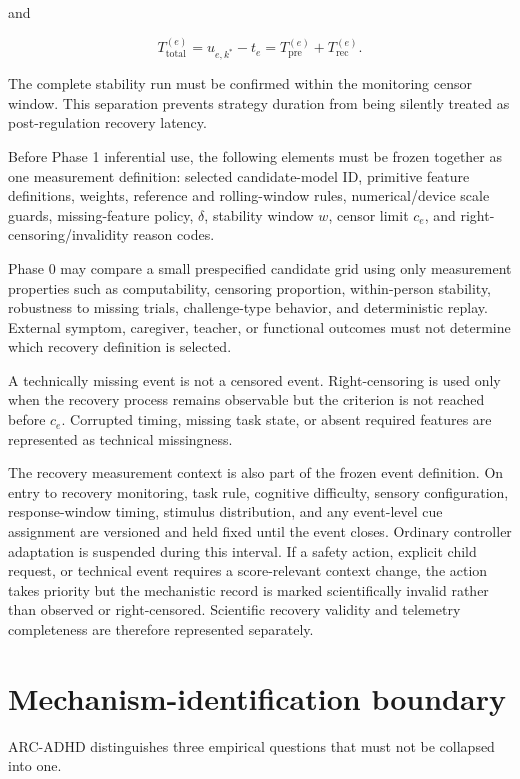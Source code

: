 \documentclass[man]{apa7}
\begin{document}
and

\[
T_{\mathrm{total}}^{(e)}
=
u_{e,k^\ast}-t_e
=
T_{\mathrm{pre}}^{(e)}+T_{\mathrm{rec}}^{(e)}.
\]

The complete stability run must be confirmed within the monitoring censor window. This separation prevents strategy duration from being silently treated as post-regulation recovery latency.

Before Phase 1 inferential use, the following elements must be frozen together as one measurement definition: selected candidate-model ID, primitive feature definitions, weights, reference and rolling-window rules, numerical/device scale guards, missing-feature policy, \(\delta\), stability window \(w\), censor limit \(c_e\), and right-censoring/invalidity reason codes.

Phase 0 may compare a small prespecified candidate grid using only measurement properties such as computability, censoring proportion, within-person stability, robustness to missing trials, challenge-type behavior, and deterministic replay. External symptom, caregiver, teacher, or functional outcomes must not determine which recovery definition is selected.

A technically missing event is not a censored event. Right-censoring is used only when the recovery process remains observable but the criterion is not reached before \(c_e\). Corrupted timing, missing task state, or absent required features are represented as technical missingness.

The recovery measurement context is also part of the frozen event definition. On entry to recovery monitoring, task rule, cognitive difficulty, sensory configuration, response-window timing, stimulus distribution, and any event-level cue assignment are versioned and held fixed until the event closes. Ordinary controller adaptation is suspended during this interval. If a safety action, explicit child request, or technical event requires a score-relevant context change, the action takes priority but the mechanistic record is marked scientifically invalid rather than observed or right-censored. Scientific recovery validity and telemetry completeness are therefore represented separately.

\section{Mechanism-identification boundary}

ARC-ADHD distinguishes three empirical questions that must not be collapsed into one.
\end{document}
